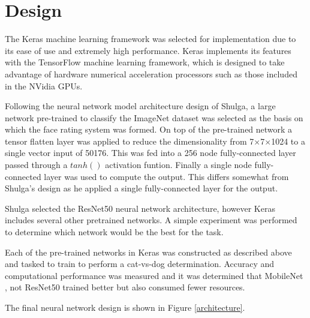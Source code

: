 \documentclass{article}
\begin{document}
\section{Design}

The Keras \citep{keras} machine learning framework was selected for implementation due to its ease of use and extremely high performance.  Keras implements its features with the TensorFlow \citep{tensorflow} machine learning framework, which is designed to take advantage of hardware numerical acceleration processors such as those included in the NVidia GPUs.

Following the neural network model architecture design of Shulga, a large network pre-trained to classify the ImageNet dataset was selected as the basis on which the face rating system was formed.  On top of the pre-trained network a tensor flatten layer was applied to reduce the dimensionality from 7$\times$7$\times$1024 to a single vector input of 50176.  This was fed into a 256 node fully-connected layer passed through a $tanh()$ activation funtion.  Finally a single node fully-connected layer was used to compute the output.  This differs somewhat from Shulga's design as he applied a single fully-connected layer for the output.

Shulga selected the ResNet50 \citep{resnet50} neural network architecture, however Keras includes several other pretrained networks.  A simple experiment was performed to determine which network would be the best for the task.

Each of the pre-trained networks in Keras was constructed as described above and tasked to train to perform a cat-vs-dog determination.  Accuracy and computational performance was measured and it was determined that MobileNet \citep{mobilenet}, not ResNet50 trained better but also consumed fewer resources.

The final neural network design is shown in Figure \ref{architecture}.
\end{document}
